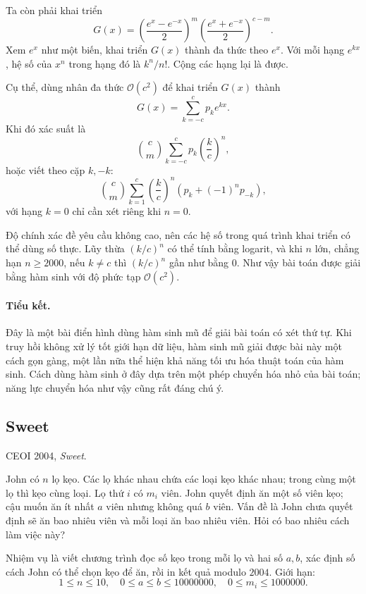 \documentclass[11pt]{article}
\newcommand{\Oh}{\mathcal{O}}
\newcommand{\C}[2]{\binom{#1}{#2}}
\begin{document}
Ta còn phải khai triển
\[
  G(x)=\left(\frac{e^x-e^{-x}}2\right)^m
       \left(\frac{e^x+e^{-x}}2\right)^{c-m}.
\]
Xem \(e^x\) như một biến, khai triển \(G(x)\) thành đa thức theo \(e^x\). Với
mỗi hạng \(e^{kx}\), hệ số của \(x^n\) trong hạng đó là \(k^n/n!\). Cộng các
hạng lại là được.

Cụ thể, dùng nhân đa thức \(\Oh(c^2)\) để khai triển \(G(x)\) thành
\[
  G(x)=\sum_{k=-c}^{c} p_k e^{kx}.
\]
Khi đó xác suất là
\[
  \C{c}{m}\sum_{k=-c}^{c} p_k\left(\frac{k}{c}\right)^n,
\]
hoặc viết theo cặp \(k,-k\):
\[
  \C{c}{m}\sum_{k=1}^{c}
  \left(\frac{k}{c}\right)^n\left(p_k+(-1)^n p_{-k}\right),
\]
với hạng \(k=0\) chỉ cần xét riêng khi \(n=0\).

Độ chính xác đề yêu cầu không cao, nên các hệ số trong quá trình khai triển có
thể dùng số thực. Lũy thừa \((k/c)^n\) có thể tính bằng logarit, và khi
\(n\) lớn, chẳng hạn \(n\ge 2000\), nếu \(k\ne c\) thì \((k/c)^n\) gần như
bằng \(0\). Như vậy bài toán được giải bằng hàm sinh với độ phức tạp
\(\Oh(c^2)\).

\paragraph{Tiểu kết.}
Đây là một bài điển hình dùng hàm sinh mũ để giải bài toán có xét thứ tự. Khi
truy hồi không xử lý tốt giới hạn dữ liệu, hàm sinh mũ giải được bài này một
cách gọn gàng, một lần nữa thể hiện khả năng tối ưu hóa thuật toán của hàm
sinh. Cách dùng hàm sinh ở đây dựa trên một phép chuyển hóa nhỏ của bài toán;
năng lực chuyển hóa như vậy cũng rất đáng chú ý.

\subsection{Sweet}

CEOI 2004, \textit{Sweet}.

John có \(n\) lọ kẹo. Các lọ khác nhau chứa các loại kẹo khác nhau; trong cùng
một lọ thì kẹo cùng loại. Lọ thứ \(i\) có \(m_i\) viên. John quyết định ăn một
số viên kẹo; cậu muốn ăn ít nhất \(a\) viên nhưng không quá \(b\) viên. Vấn đề
là John chưa quyết định sẽ ăn bao nhiêu viên và mỗi loại ăn bao nhiêu viên.
Hỏi có bao nhiêu cách làm việc này?

Nhiệm vụ là viết chương trình đọc số kẹo trong mỗi lọ và hai số \(a,b\), xác
định số cách John có thể chọn kẹo để ăn, rồi in kết quả modulo \(2004\).
Giới hạn:
\[
  1\le n\le 10,\quad 0\le a\le b\le 10000000,\quad
  0\le m_i\le 1000000.
\]
\end{document}

